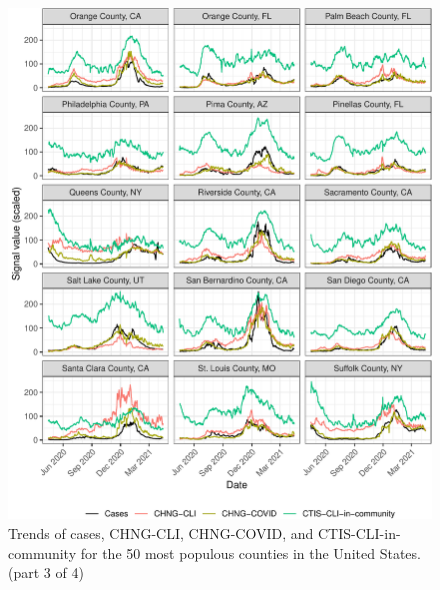 \begin{figure}

{\centering \includegraphics[width=\textwidth]{fig/county-trend-grids-3-1}

}

\caption{Trends of cases, CHNG-CLI, CHNG-COVID, and CTIS-CLI-in-community for the 50 most populous counties in the United States. (part 3 of 4)}\label{fig:county-trend-grids-3}
\end{figure}

\clearpage

